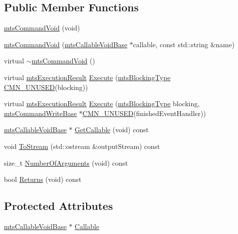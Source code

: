 \subsection*{Public Member Functions}
\begin{DoxyCompactItemize}
\item 
\hyperlink{classmts_command_void_add7891a491c181e37917f7a211d193c7}{mts\-Command\-Void} (void)
\item 
\hyperlink{classmts_command_void_a2f7b89cb275bf29655cc2ab534ccae99}{mts\-Command\-Void} (\hyperlink{classmts_callable_void_base}{mts\-Callable\-Void\-Base} $\ast$callable, const std\-::string \&name)
\item 
virtual \hyperlink{classmts_command_void_a99f6dff6f507e583a24764851e8c481a}{$\sim$mts\-Command\-Void} ()
\item 
virtual \hyperlink{classmts_execution_result}{mts\-Execution\-Result} \hyperlink{classmts_command_void_a931ef188b21159c6340021fdd7a2d373}{Execute} (\hyperlink{mts_forward_declarations_8h_ad7426ccb6c883bc780d0ee197dddcbe7}{mts\-Blocking\-Type} \hyperlink{cmn_portability_8h_a021894e2626935fa2305434b1e893ff6}{C\-M\-N\-\_\-\-U\-N\-U\-S\-E\-D}(blocking))
\item 
virtual \hyperlink{classmts_execution_result}{mts\-Execution\-Result} \hyperlink{classmts_command_void_a723eaff3810f72fe6490f36ed403e04c}{Execute} (\hyperlink{mts_forward_declarations_8h_ad7426ccb6c883bc780d0ee197dddcbe7}{mts\-Blocking\-Type} blocking, \hyperlink{classmts_command_write_base}{mts\-Command\-Write\-Base} $\ast$\hyperlink{cmn_portability_8h_a021894e2626935fa2305434b1e893ff6}{C\-M\-N\-\_\-\-U\-N\-U\-S\-E\-D}(finished\-Event\-Handler))
\item 
\hyperlink{classmts_callable_void_base}{mts\-Callable\-Void\-Base} $\ast$ \hyperlink{classmts_command_void_ad6297c6f39e9fa1fa4599bf24585d562}{Get\-Callable} (void) const 
\item 
void \hyperlink{classmts_command_void_a3b78ce1750d144b2e914be8e03274539}{To\-Stream} (std\-::ostream \&output\-Stream) const 
\item 
size\-\_\-t \hyperlink{classmts_command_void_a23ee972966793e40665977cf8f41c6be}{Number\-Of\-Arguments} (void) const 
\item 
bool \hyperlink{classmts_command_void_aeb8434a7a2da25fc331ae4bbff3ca859}{Returns} (void) const 
\end{DoxyCompactItemize}
\subsection*{Protected Attributes}
\begin{DoxyCompactItemize}
\item 
\hyperlink{classmts_callable_void_base}{mts\-Callable\-Void\-Base} $\ast$ \hyperlink{classmts_command_void_aece6de22d32c402ea6f4baf428d56a05}{Callable}
\end{DoxyCompactItemize}


